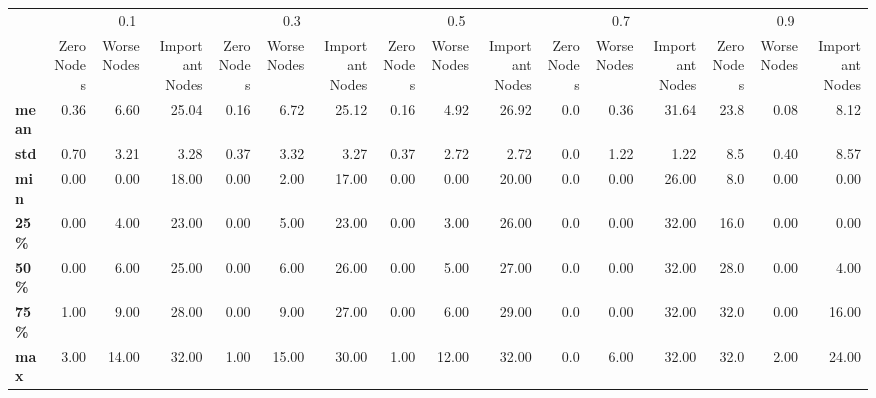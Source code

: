 \begin{tabular}{lrrrrrrrrrrrrrrr}
\toprule
{} & \multicolumn{3}{c}{0.1} & \multicolumn{3}{c}{0.3} & \multicolumn{3}{c}{0.5} & \multicolumn{3}{c}{0.7} & \multicolumn{3}{c}{0.9} \\
{} & Zero Nodes & Worse Nodes & Important Nodes & Zero Nodes & Worse Nodes & Important Nodes & Zero Nodes & Worse Nodes & Important Nodes & Zero Nodes & Worse Nodes & Important Nodes & Zero Nodes & Worse Nodes & Important Nodes \\
\midrule
\textbf{mean} &       0.36 &        6.60 &           25.04 &       0.16 &        6.72 &           25.12 &       0.16 &        4.92 &           26.92 &        0.0 &        0.36 &           31.64 &       23.8 &        0.08 &            8.12 \\
\textbf{std } &       0.70 &        3.21 &            3.28 &       0.37 &        3.32 &            3.27 &       0.37 &        2.72 &            2.72 &        0.0 &        1.22 &            1.22 &        8.5 &        0.40 &            8.57 \\
\textbf{min } &       0.00 &        0.00 &           18.00 &       0.00 &        2.00 &           17.00 &       0.00 &        0.00 &           20.00 &        0.0 &        0.00 &           26.00 &        8.0 &        0.00 &            0.00 \\
\textbf{25\% } &       0.00 &        4.00 &           23.00 &       0.00 &        5.00 &           23.00 &       0.00 &        3.00 &           26.00 &        0.0 &        0.00 &           32.00 &       16.0 &        0.00 &            0.00 \\
\textbf{50\% } &       0.00 &        6.00 &           25.00 &       0.00 &        6.00 &           26.00 &       0.00 &        5.00 &           27.00 &        0.0 &        0.00 &           32.00 &       28.0 &        0.00 &            4.00 \\
\textbf{75\% } &       1.00 &        9.00 &           28.00 &       0.00 &        9.00 &           27.00 &       0.00 &        6.00 &           29.00 &        0.0 &        0.00 &           32.00 &       32.0 &        0.00 &           16.00 \\
\textbf{max } &       3.00 &       14.00 &           32.00 &       1.00 &       15.00 &           30.00 &       1.00 &       12.00 &           32.00 &        0.0 &        6.00 &           32.00 &       32.0 &        2.00 &           24.00 \\
\bottomrule
\end{tabular}
